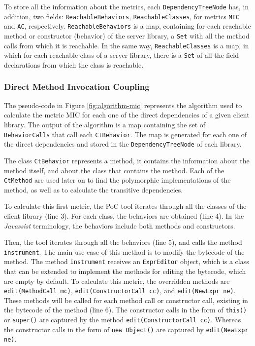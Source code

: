 To store all the information about the metrics, each \texttt{DependencyTreeNode} has, in addition, two fields: \texttt{ReachableBehaviors}, \texttt{ReachableClasses}, for metrics \texttt{MIC} and \texttt{AC}, respectively. \texttt{ReachableBehaviors} is a map, containing for each reachable method or constructor (behavior) of the server library, a \texttt{Set} with all the method calls from which it is reachable. In the same way, \texttt{ReachableClasses} is a map, in which for each reachable class of a server library, there is a \texttt{Set} of all the field declarations from which the class is reachable.


\subsubsection{Direct Method Invocation Coupling}
The pseudo-code in Figure \ref{fig:algorithm-mic} represents the algorithm used to calculate the metric MIC for each one of the direct dependencies of a given client library. The output of the algorithm is a map containing the set of \texttt{BehaviorCalls} that call each \texttt{CtBehavior}. The map is generated for each one of the direct dependencies and stored in the \texttt{DependencyTreeNode} of each library.

The class \texttt{CtBehavior} represents a method, it contains the information about the method itself, and about the class that contains the method. Each of the \texttt{CtMethod} are used later on to find the polymorphic implementations of the method, as well as to calculate the transitive dependencies.

To calculate this first metric, the PoC tool iterates through all the classes of the client library (line 3). For each class, the behaviors are obtained (line 4). In the \textit{Javassist} terminology, the behaviors include both methods and constructors.

Then, the tool iterates through all the behaviors (line 5), and calls the method \texttt{instrument}. The main use case of this method is to modify the bytecode of the method. The method \texttt{instrument} receives an \texttt{ExprEditor} object, which is a class that can be extended to implement the methods for editing the bytecode, which are empty by default. To calculate this metric, the overridden methods are \texttt{edit(MethodCall mc)}, \texttt{edit(ConstructorCall cc)}, and \texttt{edit(NewExpr ne)}. These methods will be called for each method call or constructor call, existing in the bytecode of the method (line 6). The constructor calls in the form of \texttt{this()} or \texttt{super()} are captured by the method \texttt{edit(ConstructorCall cc)}. Whereas the constructor calls in the form of \texttt{new Object()} are captured by \texttt{edit(NewExpr ne)}.

